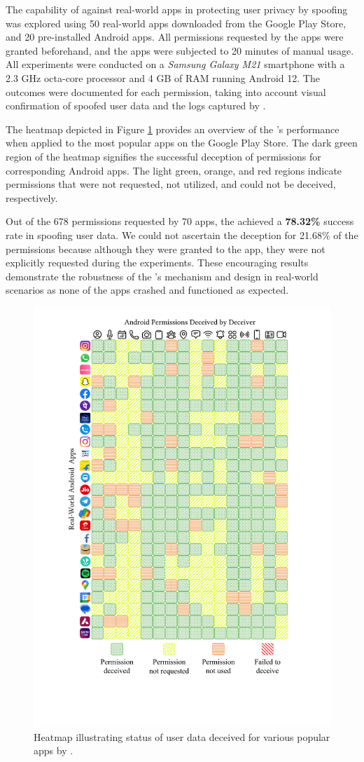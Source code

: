 The capability of \framework{} against real-world apps in protecting user privacy by spoofing was explored using 50 real-world apps downloaded from the Google Play Store, and 20 pre-installed Android apps. All permissions requested by the apps were granted beforehand, and the apps were subjected to 20 minutes of manual usage. All experiments were conducted on a \textit{Samsung Galaxy M21} smartphone with a 2.3 GHz octa-core processor and 4 GB of RAM running Android 12. The outcomes were documented for each permission, taking into account visual confirmation of spoofed user data and the logs captured by \framework{}.

The heatmap depicted in Figure \ref{fig:intro_heatmap} provides an overview of the \framework{}'s performance when applied to the most popular apps on the Google Play Store. The dark green region of the heatmap signifies the successful deception of permissions for corresponding Android apps. The light green, orange, and red regions indicate permissions that were not requested, not utilized, and could not be deceived, respectively. 

Out of the 678 permissions requested by 70 apps, the \framework{} achieved a \textbf{78.32\%} success rate in spoofing user data. We could not ascertain the deception for 21.68\% of the permissions because although they were granted to the app, they were not explicitly requested during the experiments. These encouraging results demonstrate the robustness of the \framework{}'s mechanism and design in real-world scenarios as none of the apps crashed and functioned as expected.

\begin{figure}[t]
    \centering
    \includegraphics[width=0.6\linewidth]{Figures/Introduction/heatmap.pdf}
    \caption{Heatmap illustrating status of user data deceived for various popular apps by \framework{}.}
    \label{fig:intro_heatmap}
\end{figure}

